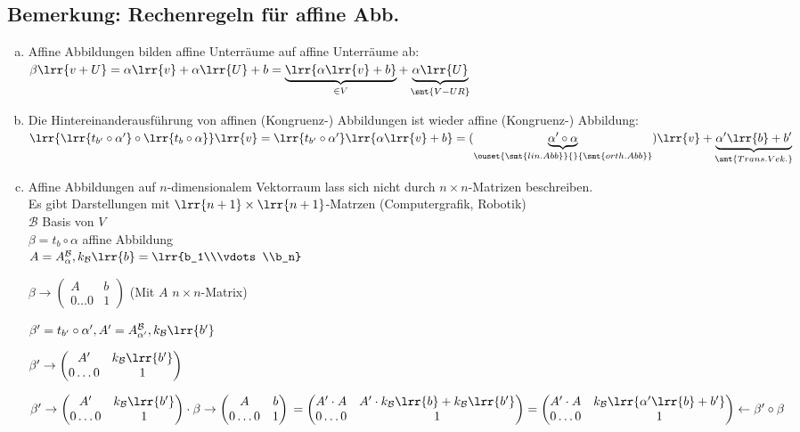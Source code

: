 \subsection{Bemerkung: Rechenregeln für affine Abb.}
	\begin{enumerate}[a)]
		\item Affine Abbildungen bilden affine Unterräume auf affine Unterräume ab:\\
			$\beta\lrr{v+U}=\alpha\lrr{v}+\alpha\lrr{U}+b =\underbrace{\lrr{\alpha\lrr{v}+b}}_{\in V}+\underbrace{\alpha\lrr{U}}_{\smt{V-UR}}$
		\item Die Hintereinanderausführung von affinen (Kongruenz-) Abbildungen ist wieder affine (Kongruenz-) Abbildung:\\
			$\lrr{\lrr{t_{b'}\circ\alpha'}\circ\lrr{t_b\circ\alpha}}\lrr{v}=\lrr{t_{b'}\circ\alpha'}\lrr{\alpha\lrr{v}+b}=(\underbrace{\alpha'\circ\alpha}_{\ouset{\smt{lin.Abb}}{}{\smt{orth. Abb}}})\lrr{v}+\underbrace{\alpha'\lrr{b}+b'}_{\smt{Trans. Vek.}}$
		\item Affine Abbildungen auf $n$-dimensionalem Vektorraum lass sich nicht durch $n\times n$-Matrizen beschreiben.\\
			Es gibt Darstellungen mit $\lrr{n+1}\times\lrr{n+1}$-Matrzen (Computergrafik, Robotik)\\
			$\mathcal{B}$ Basis von $V$\\
			$\beta=t_b\circ\alpha$ affine Abbildung\\
			$A=A_\alpha^\mathcal{B}, k_\mathcal{B}\lrr{b}=\lrr{b_1\\\vdots\\b_n}$
			
			$\beta\rightarrow\begin{pmatrix}
				A&b\\0\dots 0&1
			\end{pmatrix}$ (Mit $A$ $n\times n$-Matrix)
			
			$\beta'=t_{b'}\circ\alpha', A'=A_{\alpha'}^\mathcal{B}, k_\mathcal{B}\lrr{b'}$
			
			$\beta'\rightarrow\begin{pmatrix}
				A'&k_\mathcal{B}\lrr{b'}\\0\dots 0&1
			\end{pmatrix}$
			
			$\beta'\rightarrow\begin{pmatrix}
				A'&k_\mathcal{B}\lrr{b'}\\0\dots 0&1
			\end{pmatrix}
			\cdot
			\beta\rightarrow\begin{pmatrix}
				A&b\\0\dots 0&1
			\end{pmatrix}\\
			=\begin{pmatrix}
				A'\cdot A&A'\cdot k_\mathcal{B}\lrr{b}+k_\mathcal{B}\lrr{b'}\\0\dots 0&1
			\end{pmatrix}
			=\begin{pmatrix}
				A'\cdot A&k_\mathcal{B}\lrr{\alpha'\lrr{b}+b'}\\0\dots 0&1
			\end{pmatrix}
			\leftarrow \beta'\circ\beta$
			

\end{enumerate}
